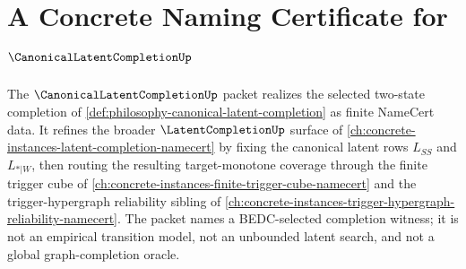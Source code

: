 \chapter{A Concrete Naming Certificate for $\CanonicalLatentCompletionUp$}
\label{ch:concrete-instances-canonical-latent-completion-namecert}

The $\CanonicalLatentCompletionUp$ packet realizes the selected two-state completion of \autoref{def:philosophy-canonical-latent-completion} as finite NameCert data. It refines the broader $\LatentCompletionUp$ surface of \autoref{ch:concrete-instances-latent-completion-namecert} by fixing the canonical latent rows $L_{SS}$ and $L_{*|W}$, then routing the resulting target-monotone coverage through the finite trigger cube of \autoref{ch:concrete-instances-finite-trigger-cube-namecert} and the trigger-hypergraph reliability sibling of \autoref{ch:concrete-instances-trigger-hypergraph-reliability-namecert}. The packet names a BEDC-selected completion witness; it is not an empirical transition model, not an unbounded latent search, and not a global graph-completion oracle.

